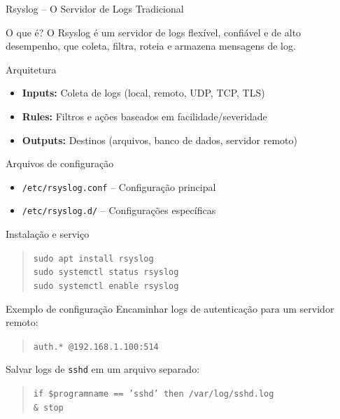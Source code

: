 \documentclass{if-beamer}
\begin{document}

\begin{frame}[allowframebreaks]{Rsyslog -- O Servidor de Logs Tradicional}
	\begin{block}{O que é?}
		O Rsyslog é um servidor de logs flexível, confiável e de alto desempenho, que coleta, filtra, roteia e armazena mensagens de log.
	\end{block}
	
	\framebreak
	
	\begin{block}{Arquitetura}
		\begin{itemize}
			\item \textbf{Inputs:} Coleta de logs (local, remoto, UDP, TCP, TLS)
			\item \textbf{Rules:} Filtros e ações baseados em facilidade/severidade
			\item \textbf{Outputs:} Destinos (arquivos, banco de dados, servidor remoto)
		\end{itemize}
	\end{block}
	
	\framebreak
	
	\begin{block}{Arquivos de configuração}
		\begin{itemize}
			\item \texttt{/etc/rsyslog.conf} -- Configuração principal
			\item \texttt{/etc/rsyslog.d/} -- Configurações específicas
		\end{itemize}
	\end{block}
	
	\framebreak
	
	\begin{block}{Instalação e serviço}
		\begin{quote}
			\texttt{sudo apt install rsyslog}\\
			\texttt{sudo systemctl status rsyslog}\\
			\texttt{sudo systemctl enable rsyslog}
		\end{quote}
	\end{block}
	
	\framebreak
	
	\begin{block}{Exemplo de configuração}
		\small
		Encaminhar logs de autenticação para um servidor remoto:
		\begin{quote}
			\texttt{auth.* @192.168.1.100:514}
		\end{quote}
		
		\vspace{0.3cm}
		Salvar logs de \texttt{sshd} em um arquivo separado:
		\begin{quote}
			\texttt{if \$programname == 'sshd' then /var/log/sshd.log}\\
			\texttt{\& stop}
		\end{quote}
	\end{block}
\end{frame}
\end{document}
